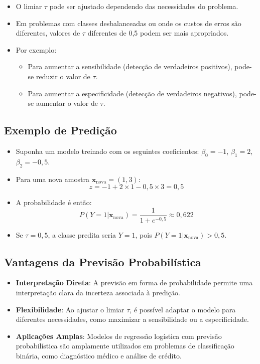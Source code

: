 \documentclass{sciposter}
\begin{document}
\begin{multicols}{3}
\begin{itemize}
    \item O limiar $\tau$ pode ser ajustado dependendo das necessidades do problema.
    \item Em problemas com classes desbalanceadas ou onde os custos de erros são diferentes, valores de $\tau$ diferentes de 0,5 podem ser mais apropriados.
    \item Por exemplo:
    \begin{itemize}
        \item Para aumentar a sensibilidade (detecção de verdadeiros positivos), pode-se reduzir o valor de $\tau$.
        \item Para aumentar a especificidade (detecção de verdadeiros negativos), pode-se aumentar o valor de $\tau$.
    \end{itemize}
\end{itemize}

\subsection{Exemplo de Predição}

\begin{itemize}
    \item Suponha um modelo treinado com os seguintes coeficientes: $\beta_0 = -1$, $\beta_1 = 2$, $\beta_2 = -0{,}5$.
    \item Para uma nova amostra $\mathbf{x}_{\text{nova}} = (1, 3)$:
    \[
    z = -1 + 2 \times 1 - 0{,}5 \times 3 = 0{,}5
    \]
    \item A probabilidade é então:
    \[
    P(Y=1|\mathbf{x}_{\text{nova}}) = \frac{1}{1 + e^{-0{,}5}} \approx 0{,}622
    \]
    \item Se $\tau = 0{,}5$, a classe predita seria $Y=1$, pois $P(Y=1|\mathbf{x}_{\text{nova}}) > 0{,}5$.
\end{itemize}

\subsection{Vantagens da Previsão Probabilística}

\begin{itemize}
    \item \textbf{Interpretação Direta}: A previsão em forma de probabilidade permite uma interpretação clara da incerteza associada à predição.
    \item \textbf{Flexibilidade}: Ao ajustar o limiar $\tau$, é possível adaptar o modelo para diferentes necessidades, como maximizar a sensibilidade ou a especificidade.
    \item \textbf{Aplicações Amplas}: Modelos de regressão logística com previsão probabilística são amplamente utilizados em problemas de classificação binária, como diagnóstico médico e análise de crédito.
\end{itemize}


\end{multicols}
\end{document}
